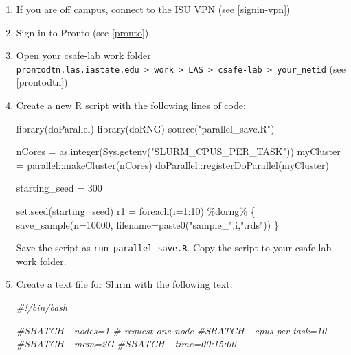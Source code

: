 \documentclass[
]{book}
\newenvironment{Shaded}{\begin{snugshade}}{\end{snugshade}}
\newcommand{\AttributeTok}[1]{\textcolor[rgb]{0.77,0.63,0.00}{#1}}
\newcommand{\CommentTok}[1]{\textcolor[rgb]{0.56,0.35,0.01}{\textit{#1}}}
\newcommand{\DecValTok}[1]{\textcolor[rgb]{0.00,0.00,0.81}{#1}}
\newcommand{\FunctionTok}[1]{\textcolor[rgb]{0.00,0.00,0.00}{#1}}
\newcommand{\NormalTok}[1]{#1}
\newcommand{\OtherTok}[1]{\textcolor[rgb]{0.56,0.35,0.01}{#1}}
\newcommand{\SpecialCharTok}[1]{\textcolor[rgb]{0.00,0.00,0.00}{#1}}
\newcommand{\StringTok}[1]{\textcolor[rgb]{0.31,0.60,0.02}{#1}}
\begin{document}
\begin{enumerate}
\def\labelenumi{\arabic{enumi}.}
\item
  If you are off campus, connect to the ISU VPN (see \ref{signin-vpn})
\item
  Sign-in to Pronto (see \ref{pronto}).
\item
  Open your csafe-lab work folder \texttt{prontodtn.las.iastate.edu\ \textgreater{}\ work\ \textgreater{}\ LAS\ \textgreater{}\ csafe-lab\ \textgreater{}\ your\_netid} (see \ref{prontodtn})
\item
  Create a new R script with the following lines of code:

\begin{Shaded}
\begin{Highlighting}[]
\FunctionTok{library}\NormalTok{(doParallel)}
\FunctionTok{library}\NormalTok{(doRNG)}
\FunctionTok{source}\NormalTok{(}\StringTok{"parallel\_save.R"}\NormalTok{)}

\NormalTok{nCores }\OtherTok{=} \FunctionTok{as.integer}\NormalTok{(}\FunctionTok{Sys.getenv}\NormalTok{(}\StringTok{"SLURM\_CPUS\_PER\_TASK"}\NormalTok{))}
\NormalTok{myCluster }\OtherTok{=}\NormalTok{ parallel}\SpecialCharTok{::}\FunctionTok{makeCluster}\NormalTok{(nCores)}
\NormalTok{doParallel}\SpecialCharTok{::}\FunctionTok{registerDoParallel}\NormalTok{(myCluster)}

\NormalTok{starting\_seed }\OtherTok{=} \DecValTok{300}

\FunctionTok{set.seed}\NormalTok{(starting\_seed)}
\NormalTok{r1 }\OtherTok{=} \FunctionTok{foreach}\NormalTok{(}\AttributeTok{i=}\DecValTok{1}\SpecialCharTok{:}\DecValTok{10}\NormalTok{) }\SpecialCharTok{\%dorng\%}\NormalTok{ \{}
  \FunctionTok{save\_sample}\NormalTok{(}\AttributeTok{n=}\DecValTok{10000}\NormalTok{, }\AttributeTok{filename=}\FunctionTok{paste0}\NormalTok{(}\StringTok{"sample\_"}\NormalTok{,i,}\StringTok{".rds"}\NormalTok{)) }
\NormalTok{\}}
\end{Highlighting}
\end{Shaded}

  Save the script as \texttt{run\_parallel\_save.R}. Copy the script to your csafe-lab work folder.
\item
  Create a text file for Slurm with the following text:

\begin{Shaded}
\begin{Highlighting}[]
\CommentTok{\#!/bin/bash}

\CommentTok{\#SBATCH {-}{-}nodes=1 \# request one node}
\CommentTok{\#SBATCH {-}{-}cpus{-}per{-}task=10}
\CommentTok{\#SBATCH {-}{-}mem=2G }
\CommentTok{\#SBATCH {-}{-}time=00:15:00}


\end{Highlighting}
\end{Shaded}
\end{enumerate}
\end{document}
